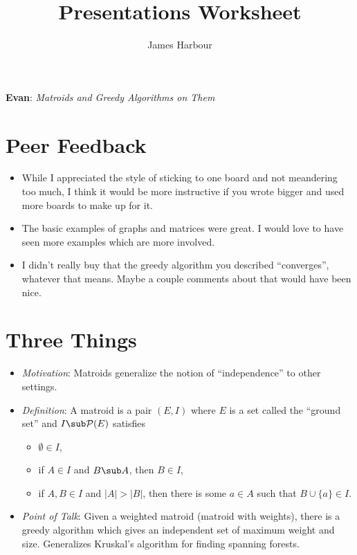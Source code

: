 \documentclass[12pt]{article}
\title{Presentations Worksheet}
\author{James Harbour}
\begin{document}
\begin{center}
  \Large\textbf{Evan}: \textit{Matroids and Greedy Algorithms on Them}
\end{center}

\section*{Peer Feedback}

\begin{itemize}
  \item While I appreciated the style of sticking to one board and not meandering too much, I think it would be more instructive if you wrote bigger and used more boards to make up for it.
  \item The basic examples of graphs and matrices were great. I would love to have seen more examples which are more involved.
  \item I didn't really buy that the greedy algorithm you described ``converges'', whatever that means. Maybe a couple comments about that would have been nice. 
\end{itemize}

\section*{Three Things}

\begin{itemize}
  \item \textit{Motivation}: Matroids generalize the notion of ``independence'' to other settings.
  \item \textit{Definition}: A matroid is a pair $ (E, I) $ where $ E $ is a set called the ``ground set'' and $ I\sub \mathcal{P}(E) $ satisfies 
    \begin{itemize}
      \item $ \emptyset \in I $,
      \item if $ A\in I $ and $ B\sub A $, then $ B\in I $,
      \item if $ A,B\in I $ and $ |A| > |B| $, then there is some $ a\in A $ such that $ B\cup \{a\} \in I $.
    \end{itemize}
  \item \textit{Point of Talk}: Given a weighted matroid (matroid with weights), there is a greedy algorithm which gives an independent set of maximum weight and size. Generalizes Kruskal's algorithm for finding spanning forests.
\end{itemize}
\end{document}
